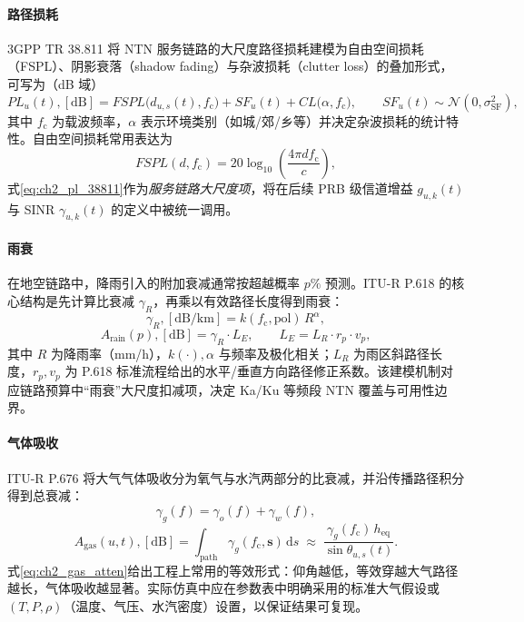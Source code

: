 \documentclass[type=master]{fduthesis}
\begin{document}
\paragraph{路径损耗}
3GPP TR 38.811 将 NTN 服务链路的大尺度路径损耗建模为自由空间损耗（FSPL）、阴影衰落（shadow fading）与杂波损耗（clutter loss）的叠加形式，可写为（dB 域）
\begin{equation}
PL_u(t),[\mathrm{dB}]
=
FSPL\big(d_{u,s}(t),f_{\mathrm{c}}\big)
+
SF_u(t)
+
CL\big(\alpha,f_{\mathrm{c}}\big),
\qquad
SF_u(t)\sim\mathcal{N}(0,\sigma_{\mathrm{SF}}^2),
\label{eq:ch2_pl_38811}
\end{equation}
其中 $f_{\mathrm{c}}$ 为载波频率，$\alpha$ 表示环境类别（如城/郊/乡等）并决定杂波损耗的统计特性。自由空间损耗常用表达为
\begin{equation}
FSPL(d,f_{\mathrm{c}})=20\log_{10}\!\left(\frac{4\pi d f_{\mathrm{c}}}{c}\right),
\label{eq:ch2_fspl}
\end{equation}
式\eqref{eq:ch2_pl_38811}作为\emph{服务链路大尺度项}，将在后续 PRB 级信道增益 $g_{u,k}(t)$ 与 SINR $\gamma_{u,k}(t)$ 的定义中被统一调用。

\paragraph{雨衰}
在地空链路中，降雨引入的附加衰减通常按超越概率 $p\%$ 预测。ITU-R P.618 的核心结构是先计算比衰减 $\gamma_R$，再乘以有效路径长度得到雨衰：
\begin{equation}
\gamma_R,[\mathrm{dB/km}] = k(f_{\mathrm{c}},\mathrm{pol})\,R^{\alpha},
\label{eq:ch2_rain_specific}
\end{equation}
\begin{equation}
A_{\mathrm{rain}}(p),[\mathrm{dB}] = \gamma_R \cdot L_E,
\qquad
L_E=L_R\cdot r_p\cdot v_p,
\label{eq:ch2_rain_atten}
\end{equation}
其中 $R$ 为降雨率（mm/h），$k(\cdot),\alpha$ 与频率及极化相关；$L_R$ 为雨区斜路径长度，$r_p,v_p$ 为 P.618 标准流程给出的水平/垂直方向路径修正系数。该建模机制对应链路预算中“雨衰”大尺度扣减项，决定 Ka/Ku 等频段 NTN 覆盖与可用性边界。

\paragraph{气体吸收}
ITU-R P.676 将大气气体吸收分为氧气与水汽两部分的比衰减，并沿传播路径积分得到总衰减：
\begin{equation}
\gamma_g(f)=\gamma_o(f)+\gamma_w(f),
\label{eq:ch2_gas_specific}
\end{equation}
\begin{equation}
A_{\mathrm{gas}}(u,t),[\mathrm{dB}]
=
\int_{\text{path}} \gamma_g(f_{\mathrm{c}},\mathbf{s})\,\mathrm{d}s
\;\approx\;
\frac{\gamma_g(f_{\mathrm{c}})\,h_{\mathrm{eq}}}{\sin \theta_{u,s}(t)}.
\label{eq:ch2_gas_atten}
\end{equation}
式\eqref{eq:ch2_gas_atten}给出工程上常用的等效形式：仰角越低，等效穿越大气路径越长，气体吸收越显著。实际仿真中应在参数表中明确采用的标准大气假设或 $(T,P,\rho)$（温度、气压、水汽密度）设置，以保证结果可复现。
\end{document}
